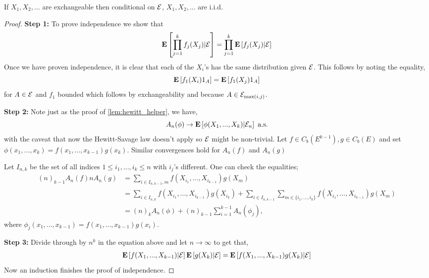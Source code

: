 \documentclass{article}
\begin{document}
\begin{thm}\label{thm:deFinetti}
    If $X_1,X_2,...$ are exchangeable then conditional on $\mathcal E$, $X_1,X_2,...$ are i.i.d.
\end{thm}
\begin{proof}
    \textbf{Step 1:}
    To prove independence we show that
    \begin{equation*}
        {\mathbf E}\left[\prod_{j=1}^kf_j(X_j)|\mathcal E\right]=\prod_{j=1}^k{\mathbf E}\left[f_j(X_j)|\mathcal E\right]
    \end{equation*}
    Once we have proven independence, it is clear that each of the $X_i$'s has the same distribution given $\mathcal E$.
    This follows by noting the equality,
    \begin{equation*}
        {\mathbf E}\left[f_1(X_i)1_A\right]={\mathbf E}\left[f_1(X_j)1_A\right]
    \end{equation*}
    for $A\in\mathcal E$ and $f_1$ bounded which follows by exchangeability and because $A\in\mathcal E_{\max(i,j)}$.

    \textbf{Step 2:}
    Note just as the proof of \ref{lem:hewitt_helper}, we have,
    \begin{equation*}
        A_n(\phi)\rightarrow{\mathbf E}\left[\phi(X_1,...,X_k)|\mathcal E_n\right]\text{ a.s.}
    \end{equation*}
    with the caveat that now the Hewitt-Savage law doesn't apply so $\mathcal E$ might be non-trivial.
    Let $f\in C_b(E^{k-1}),g\in C_b(E)$ and set $\phi(x_1,...,x_k)=f(x_1,...,x_{k-1})g(x_k)$.
    Similar convergences hold for $A_n(f)$ and $A_n(g)$

    Let $I_{n,k}$ be the set of all indices $1\leq i_1,...,i_k\leq n$ with $i_j$'s different.
    One can check the equalities;
    \begin{align*}
        (n)_{k-1}A_n(f)nA_n(g)&=\sum_{i\in I_{n,k-1},m}f(X_{i_1},...,X_{i_{k-1}})g(X_m)\\
        &=\sum_{i\in I_{n,k}}f(X_{i_1},...,X_{i_{k-1}})g(X_{i_k})+\sum_{i\in I_{n,k-1}}\sum_{m\in\{i_1,...,i_k\}}f(X_{i_1},...,X_{i_{k-1}})g(X_m)\\
        &=(n)_kA_n(\phi)+(n)_{k-1}\sum_{i=1}^{k-1}A_n(\phi_j),
    \end{align*}
    where $\phi_j(x_1,...,x_{k-1})=f(x_1,...,x_{k-1})g(x_i)$.

    \textbf{Step 3:}
    Divide through by $n^k$ in the equation above and let $n\rightarrow\infty$ to get that,
    \begin{align*}
        {\mathbf E}\left[f(X_1,...,X_{k-1})|\mathcal E\right]{\mathbf E}\left[g(X_k)|\mathcal E\right]={\mathbf E}\left[f(X_1,...,X_{k-1})g(X_k)|\mathcal E\right]
    \end{align*}
    Now an induction finishes the proof of independence.
\end{proof}
\end{document}
